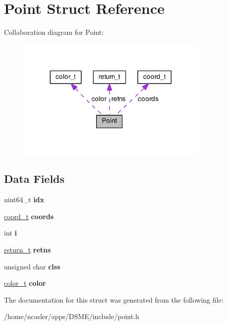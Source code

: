 \hypertarget{structPoint}{}\section{Point Struct Reference}
\label{structPoint}


Collaboration diagram for Point\+:\nopagebreak
\begin{figure}[H]
\begin{center}
\leavevmode
\includegraphics[width=263pt]{dc/d3b/structPoint__coll__graph}
\end{center}
\end{figure}
\subsection*{Data Fields}
\begin{DoxyCompactItemize}
\item 
\hypertarget{structPoint_a55102ae8e345d14df73d7e5e341dda1e}{}uint64\+\_\+t {\bfseries idx}\label{structPoint_a55102ae8e345d14df73d7e5e341dda1e}

\item 
\hypertarget{structPoint_ac8b4f48f5ffbf950e49966f31f76e340}{}\hyperlink{structcoord__t}{coord\+\_\+t} {\bfseries coords}\label{structPoint_ac8b4f48f5ffbf950e49966f31f76e340}

\item 
\hypertarget{structPoint_acae5ade0df0b43fc8728ac4936cc9de1}{}int {\bfseries i}\label{structPoint_acae5ade0df0b43fc8728ac4936cc9de1}

\item 
\hypertarget{structPoint_a019325e9ff1136cd55459356be5835ba}{}\hyperlink{structreturn__t}{return\+\_\+t} {\bfseries retns}\label{structPoint_a019325e9ff1136cd55459356be5835ba}

\item 
\hypertarget{structPoint_ab4a34b7297d6cd29197108e792a4b66f}{}unsigned char {\bfseries clss}\label{structPoint_ab4a34b7297d6cd29197108e792a4b66f}

\item 
\hypertarget{structPoint_a0a95eb2d2f21f0c809d6e27dcd92e335}{}\hyperlink{structcolor__t}{color\+\_\+t} {\bfseries color}\label{structPoint_a0a95eb2d2f21f0c809d6e27dcd92e335}

\end{DoxyCompactItemize}


The documentation for this struct was generated from the following file\+:\begin{DoxyCompactItemize}
\item 
/home/ncasler/apps/\+D\+S\+M\+E/include/point.\+h\end{DoxyCompactItemize}
